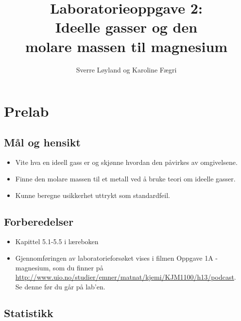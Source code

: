
 

\title{Laboratorieoppgave 2:\\
	Ideelle gasser og den \\
	molare massen til magnesium}
\author{Sverre Løyland og Karoline Fægri}
\date{}


	
	\maketitle
	
	\section{Prelab}
	
	\subsection{Mål og hensikt}
	\begin{itemize}
		\item Vite hva en ideell gass er og skjønne hvordan den påvirkes av omgivelsene.
		
		\item Finne den molare massen til et metall ved å bruke teori om ideelle gasser.
		
		\item Kunne beregne usikkerhet uttrykt som standardfeil. 
	\end{itemize}
	
	\subsection{Forberedelser}
	\begin{itemize}
		\item Kapittel 5.1-5.5 i læreboken
		
		\item Gjennomføringen av laboratorieforsøket vises i filmen Oppgave 1A - magnesium, som du finner på \\ \url{http://www.uio.no/studier/emner/matnat/kjemi/KJM1100/h13/podcast}. \\
		Se denne før du går på lab'en.
	\end{itemize}
	
	\subsection{Statistikk}
